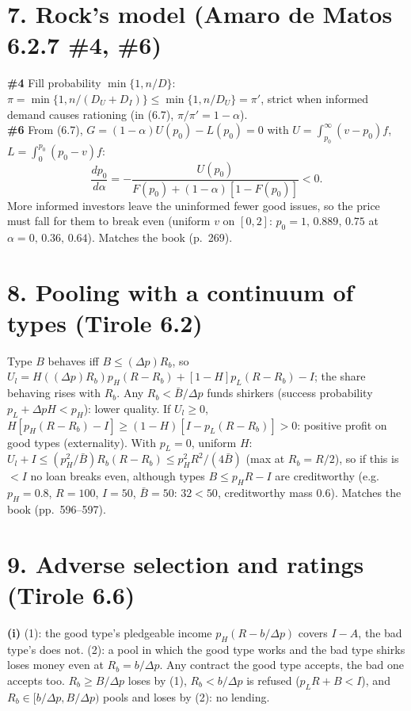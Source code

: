 \documentclass[11pt,a4paper]{article}
\begin{document}
\section*{7. Rock's model (Amaro de Matos 6.2.7 \#4, \#6)}
\textbf{\#4} Fill probability $\min\{1,n/D\}$: $\pi=\min\{1,n/(D_U+D_I)\}\le\min\{1,n/D_U\}=\pi'$, strict when informed demand causes rationing (in (6.7), $\pi/\pi'=1-\alpha$).\\
\textbf{\#6} From (6.7), $G=(1-\alpha)U(p_0)-L(p_0)=0$ with $U=\int_{p_0}^\infty(v-p_0)f$, $L=\int_0^{p_0}(p_0-v)f$:
$$\frac{dp_0}{d\alpha}=-\frac{U(p_0)}{F(p_0)+(1-\alpha)[1-F(p_0)]}<0 .$$
More informed investors leave the uninformed fewer good issues, so the price must fall for them to break even (uniform $v$ on $[0,2]$: $p_0=1,\,0.889,\,0.75$ at $\alpha=0,\,0.36,\,0.64$). Matches the book (p.~269).

\section*{8. Pooling with a continuum of types (Tirole 6.2)}
Type $B$ behaves iff $B\le(\Delta p)R_b$, so $U_l=H((\Delta p)R_b)p_H(R-R_b)+[1-H]p_L(R-R_b)-I$; the share behaving rises with $R_b$. Any $R_b<\bar B/\Delta p$ funds shirkers (success probability $p_L+\Delta p H<p_H$): lower quality. If $U_l\ge0$, $H[p_H(R-R_b)-I]\ge(1-H)[I-p_L(R-R_b)]>0$: positive profit on good types (externality). With $p_L=0$, uniform $H$: $U_l+I\le(p_H^2/\bar B)R_b(R-R_b)\le p_H^2R^2/(4\bar B)$ (max at $R_b=R/2$), so if this is $<I$ no loan breaks even, although types $B\le p_HR-I$ are creditworthy (e.g.\ $p_H=0.8$, $R=100$, $I=50$, $\bar B=50$: $32<50$, creditworthy mass $0.6$). Matches the book (pp.~596--597).

\section*{9. Adverse selection and ratings (Tirole 6.6)}

\textbf{(i)} (1): the good type's pledgeable income $p_H(R-b/\Delta p)$ covers $I-A$, the bad type's does not.
(2): a pool in which the good type works and the bad type shirks loses money even at $R_b=b/\Delta p$.
Any contract the good type accepts, the bad one accepts too. $R_b\ge B/\Delta p$ loses by (1),
$R_b<b/\Delta p$ is refused ($p_LR+B<I$), and $R_b\in[b/\Delta p,B/\Delta p)$ pools and loses by (2): no lending.
\end{document}
